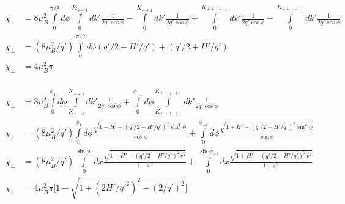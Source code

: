 \documentclass[prb,showpacs,amssymb,amsmath,twocolumn]{revtex4-1}
\begin{document}
\begin{widetext}
 \begin{align*}
 \chi_\perp&=8\mu_B^2 \int\limits_0^{\pi/2} d\phi \int\limits_0^{K_{++1}}dk'  \frac{ 1}{ 2q'\cos\phi} -\int\limits_0^{K_{-+1}} dk'  \frac{ 1}{ 2q'\cos\phi} +\int\limits_0^{K_{++(-1)}} dk'  \frac{ 1}{ 2q'\cos\phi} -\int\limits_0^{K_{-+(-1)}} dk'  \frac{ 1}{ 2q'\cos\phi} \\
  \chi_\perp&=(8\mu_B^2/q') \int\limits_0^{\pi/2} d\phi (q'/2-H'/q')+(q'/2+H'/q') \\
  \chi_\perp&=4\mu_B^2\pi\\
 \end{align*}
  
    \begin{align*}
 \chi_\perp&=8\mu_B^2 \int\limits_0^{\phi_1} d\phi \int\limits_{K_{+-1}}^{K_{++1}}dk'  \frac{ 1}{ 2q'\cos\phi}+\int\limits_0^{\phi_{-1}} d\phi \int\limits_{K_{+-(-1)}}^{K_{++(-1)}} dk'  \frac{ 1}{ 2q'\cos\phi}  \\
  \chi_\perp&=(8\mu_B^2/q') \int\limits_0^{\phi_1} d\phi   \frac{ \sqrt{1-H'-(q'/2-H'/q')^2\sin^2\phi}}{ \cos\phi} 
 + \int\limits_0^{\phi_{-1}} d\phi \frac{  \sqrt{1+H'-(q'/2+H'/q')^2\sin^2\phi}}{ \cos\phi}  \\
   \chi_\perp&=(8\mu_B^2/q') \int\limits_0^{\sin\phi_1} dx \frac{ \sqrt{1-H'-(q'/2-H'/q')^2x^2}}{ 1-x^2} 
 +\int\limits_0^{\sin\phi_{-1}} dx \frac{  \sqrt{1+H'-(q'/2+H'/q')^2 x^2}}{ 1-x^2}  \\
    \chi_\perp&=4\mu_B^2\pi \bigg[1-\sqrt{1+(2H'/q'^2)^2-(2/q')^2}\bigg] \\
 \end{align*}
\end{widetext}







\end{document}
